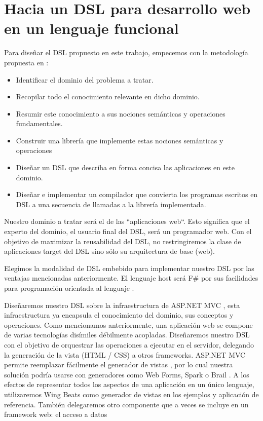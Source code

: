 \documentclass[12pt]{report}
\begin{document}
\chapter{Hacia un DSL para desarrollo web en un lenguaje funcional}

Para diseñar el DSL propuesto en este trabajo, empecemos con la metodología propuesta en \cite{van1998little}:

\begin{itemize}
	\item Identificar el dominio del problema a tratar.
	\item Recopilar todo el conocimiento relevante en dicho dominio.
	\item Resumir este conocimiento a sus nociones semánticas y operaciones fundamentales.
	\item Construir una librería que implemente estas nociones semánticas y operaciones
	\item Diseñar un DSL que describa en forma concisa las aplicaciones en este dominio.
	\item Diseñar e implementar un compilador que convierta los programas escritos en DSL a una secuencia de llamadas a la librería implementada.
\end{itemize}

Nuestro dominio a tratar será el de las ``aplicaciones web``. Esto significa que el experto del dominio, el usuario final del DSL, será un programador web. Con el objetivo de maximizar la reusabilidad del DSL, no restringiremos la clase de aplicaciones target del DSL sino sólo su arquitectura de base (web). 

Elegimos la modalidad de DSL embebido para implementar nuestro DSL por las ventajas mencionadas anteriormente. El lenguaje host será F\# por sus facilidades para programación orientada al lenguaje \cite{syme2007expert} \cite{pickering2007foundations} \cite{smith-lop} \cite{petricek-lop}.

Diseñaremos nuestro DSL sobre la infraestructura de ASP.NET MVC \cite{mvc}, esta infraestructura ya encapsula el conocimiento del dominio, sus conceptos y operaciones. 
Como mencionamos anteriormente, una aplicación web se compone de varias tecnologías disímiles débilmente acopladas. Diseñaremos nuestro DSL con el objetivo de orquestrar las operaciones a ejecutar en el servidor, delegando la generación de la vista (HTML / CSS) a otros frameworks. ASP.NET MVC permite reemplazar fácilmente el generador de vistas \cite{mvcrender}, por lo cual nuestra solución podría usarse con generadores como Web Forms, Spark \cite{spark} o Brail \cite{brail}. A los efectos de representar todos los aspectos de una aplicación en un único lenguaje, utilizaremos Wing Beats \cite{wingbeats} como generador de vistas en los ejemplos y aplicación de referencia.
También delegaremos otro componente que a veces se incluye en un framework web: el acceso a datos



\end{document}
